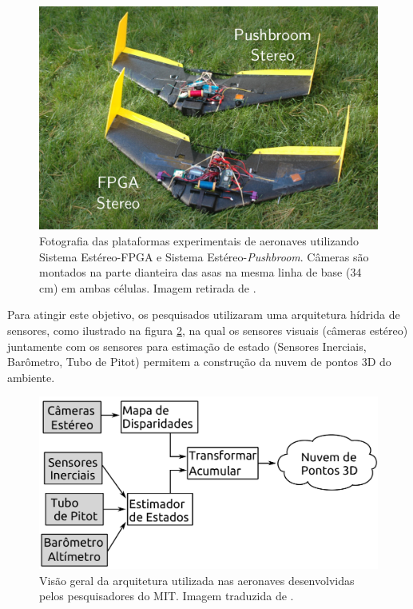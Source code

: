 \begin{figure}[]
 	\centering
 	\includegraphics[scale=0.26]{./Resources/mit_drones.png}
 	\caption{Fotografia das plataformas experimentais de aeronaves utilizando Sistema Estéreo-FPGA e Sistema Estéreo-\textit{Pushbroom}. Câmeras são montados na parte dianteira das asas na mesma linha de base (34 cm) em ambas células. Imagem retirada de \cite{BarryMIT}.}
 	\label{mit_drones}
\end{figure}

Para atingir este objetivo, os pesquisados utilizaram uma arquitetura hídrida de sensores, como ilustrado na figura \ref{barry_diagram}, na qual os sensores visuais (câmeras estéreo) juntamente com os sensores para estimação de estado (Sensores Inerciais, Barômetro, Tubo de Pitot) permitem a construção da nuvem de pontos 3D do ambiente.

\begin{figure}[]
 	\centering
 	\includegraphics[scale=0.20]{./Resources/barry_diagram.png}
 	\caption{Visão geral da arquitetura utilizada nas aeronaves desenvolvidas pelos pesquisadores do MIT. Imagem traduzida de \cite{Barry2014}.}
 	\label{barry_diagram}
\end{figure}



